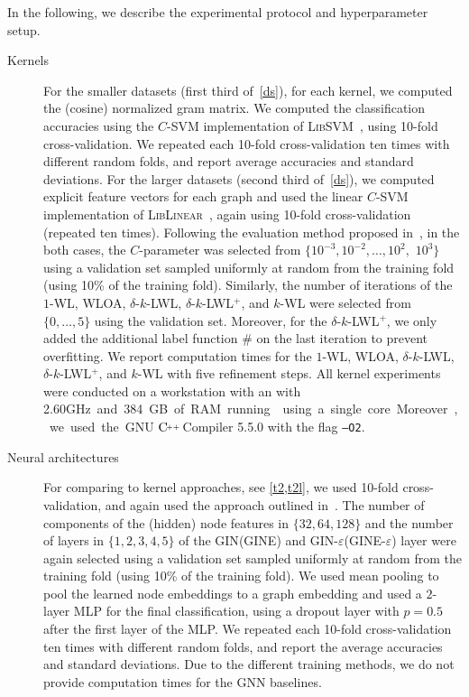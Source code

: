 \documentclass{article}
\theoremstyle{definition}
\newcommand{\CC}[1][]{$\text{C\hspace{-.25ex}}^{_{_{_{++}}}}
	\ifthenelse{\equal{#1}{}}{}{\text{\hspace{-.625ex}#1}}$}
\newcommand{\wl}{$1$-\textsf{WL}\xspace}
\newcommand{\kwl}{$k$-\textsf{WL}\xspace}
\newcommand{\localkwl}{$\delta$-$k$-\textsf{LWL}\xspace}
\newcommand{\pluskwl}{$\delta$-$k$-\textsf{LWL}$^+$\xspace}
\newcommand{\wloa}{\textsf{WLOA}\xspace}
\newcommand{\gin}{\textsf{GIN}\xspace}
\newcommand{\gine}{\textsf{GINE}\xspace}
\newcommand{\gineps}{\textsf{GIN-$\varepsilon$}\xspace}
\newcommand{\gineeps}{\textsf{GINE-$\varepsilon$}\xspace}
\begin{document}
In the following, we describe the experimental protocol and hyperparameter setup.
\begin{description}
	\item[Kernels] For the smaller datasets (first third of~\cref{ds}), for each kernel, we computed the (cosine) normalized gram matrix. We computed the classification accuracies using the $C$-SVM implementation of \textsc{LibSVM}~\cite{Cha+11}, using 10-fold cross-validation. 
	We repeated each 10-fold cross-validation ten times with different random folds, and report average accuracies and standard deviations. For the larger datasets (second third of~\cref{ds}), we computed explicit feature vectors for each graph and used the linear $C$-SVM implementation of \textsc{LibLinear}~\cite{Fan+2008}, again using 10-fold cross-validation (repeated ten times). 
	Following the evaluation method proposed in~\cite{Mor+2020}, in the both cases, the $C$-parameter was selected from $\{10^{-3}, 10^{-2}, \dotsc, 10^{2},$ $10^{3}\}$ using a validation set sampled uniformly at random from the training fold (using 10\% of the training fold). Similarly, the number of iterations of the \wl, \wloa, \localkwl, \pluskwl, and \kwl were selected from $\{0,\dotsc,5\}$ using the validation set. Moreover, for the \pluskwl, we only added the additional label function $\#$ on the last iteration to prevent overfitting.
	We report computation times for the \wl, \wloa, \localkwl, \pluskwl, and \kwl with five refinement steps. All kernel experiments were conducted on a workstation with an  with 2.60\si GHz and 384\si GB of RAM running  using a single core. Moreover, we used the GNU \CC Compiler 5.5.0 with the flag \texttt{--O2}. 
	\item[Neural architectures] For comparing to kernel approaches, see \cref{t2,t2l}, we used 10-fold cross-validation, and again used the approach outlined in~\cite{Mor+2020}. The number of components of the (hidden) node features in $\{ 32, 64, 128 \}$ and the number of layers in $\{ 1,2,3,4,5\}$ of the \gin (\gine) and \gineps (\gineeps) layer were again selected using a validation set sampled uniformly at random from the training fold (using 10\% of the training fold). We used mean pooling to pool the learned node embeddings to a graph embedding and used a $2$-layer MLP for the final classification, using a dropout layer with $p = 0.5$ after the first layer
	of the MLP. We repeated each 10-fold cross-validation ten times with different random folds, and report the average accuracies and standard deviations. Due to the different training methods, we do not provide computation times for the GNN baselines. 
	

\end{description}
\end{document}
